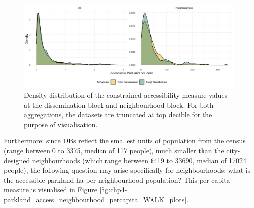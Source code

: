 \documentclass[
11pt, %
oneside, %
english, %
singlespacing, %
]{macthesis} %
\begin{document}
\begin{figure}

{\centering \includegraphics[width=6in]{./data/figures/chp4-dist_db_vs_neigh_plots} 

}

\caption{\label{fig:chp4-dist_db_vs_neigh_plots}Density distribution of the constrained accessibility measure values at the dissemination block and neighbourhood block. For both aggregations, the datasets are truncated at top decible for the purpose of visualisation.}\label{fig:unnamed-chunk-59}
\end{figure}

Furthermore: since DBs reflect the smallest units of population from the census (range between 0 to 3375, median of 117 people), much smaller than the city-designed neighbourhoods (which range between 6419 to 33690, median of 17024 people), the following question may arise specifically for neighbourhoods: what is the accessible parkland ha per neighbourhood population? This per capita measure is visualised in Figure \ref{fig:chp4-parkland_access_neighbourhood_percapita_WALK_plots}.
\end{document}
